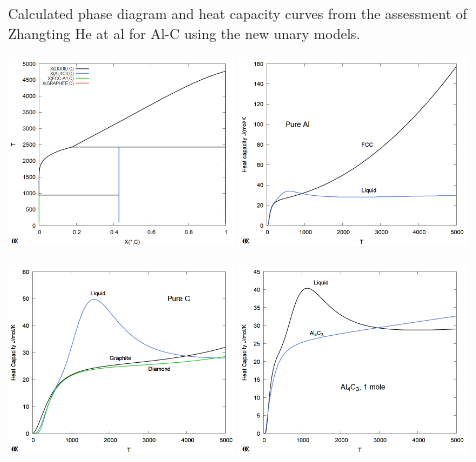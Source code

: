 \documentclass{article}
\begin{document}
\begin{appendices}
\newpage

Calculated phase diagram and heat capacity curves from the assessment
of Zhangting He at al for Al-C using the new unary models.


\includegraphics[width=0.45\textwidth]{Documents/AlC/AlC-PD.png}
\includegraphics[width=0.45\textwidth]{Documents/AlC/Al-Cp-fcc+liquid.png}

\includegraphics[width=0.45\textwidth]{Documents/AlC/C-Cp-liquid+graphite+diamond.png}
\includegraphics[width=0.45\textwidth]{Documents/AlC/Al4C3-Cp.png}


\end{appendices}
\end{document}
